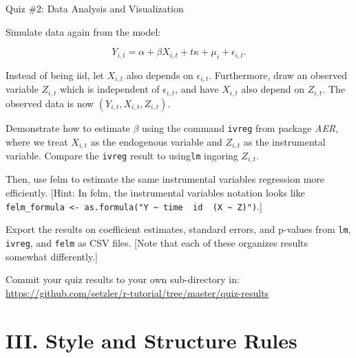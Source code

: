\documentclass[10pt,ignorenonframetext,]{beamer}
\begin{document}
\begin{frame}[fragile]{Quiz \#2: Data Analysis and Visualization}

Simulate data again from the model:

\[
Y_{i,t} = \alpha + \beta X_{i,t} + t\kappa  + \mu_i + \epsilon_{i,t}.
\]

Instead of being iid, let \(X_{i,t}\) also depends on
\(\epsilon_{i,t}\). Furthermore, draw an observed variable \(Z_{i,t}\)
which is independent of \(\epsilon_{i,t}\), and have \(X_{i,t}\) also
depend on \(Z_{i,t}\). The observed data is now
\((Y_{i,t},X_{i,t},Z_{i,t})\).

Demonstrate how to estimate \(\beta\) using the command \texttt{ivreg}
from package \emph{AER}, where we treat \(X_{i,t}\) as the endogenous
variable and \(Z_{i,t}\) as the instrumental variable. Compare the
\texttt{ivreg} result to using\texttt{lm} ingoring \(Z_{i,t}\).

Then, use felm to estimate the same instrumental variables regression
more efficiently. {[}Hint: In felm, the instrumental variables notation
looks like
\texttt{felm\_formula\ \textless{}-\ as.formula("Y\ \textasciitilde{}\ time\ \textbar{}\ id\ \textbar{}\ (X\ \textasciitilde{}\ Z)")}.{]}

Export the results on coefficient estimates, standard errors, and
p-values from \texttt{lm}, \texttt{ivreg}, and \texttt{felm} as CSV
files. {[}Note that each of these organizes results somewhat
differently.{]}

Commit your quiz results to your own sub-directory in:
\url{https://github.com/setzler/r-tutorial/tree/master/quiz-results}

\end{frame}

\section{III. Style and Structure
Rules}\label{iii.-style-and-structure-rules}
\end{document}
